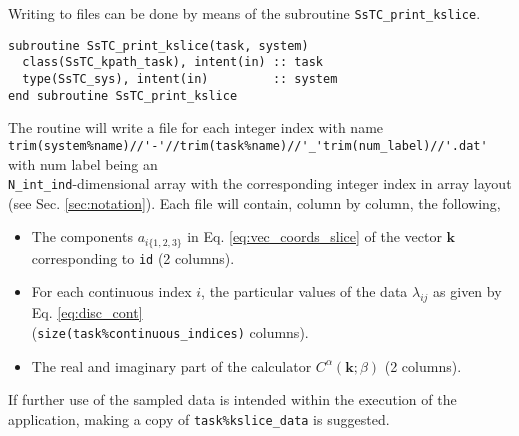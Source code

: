 \documentclass[10pt,a4paper]{article}
\begin{document}
Writing to files can be done by means of the subroutine \verb|SsTC_print_kslice|.
\begin{lstlisting}[caption={Interface of the ``kslice" printer.},captionpos=b]
subroutine SsTC_print_kslice(task, system)
  class(SsTC_kpath_task), intent(in) :: task
  type(SsTC_sys), intent(in)         :: system
end subroutine SsTC_print_kslice
\end{lstlisting}
The routine will write a file for each integer index with name \\ \verb|trim(system%name)//'-'//trim(task%name)//'_'trim(num_label)//'.dat'| with num label being an \\ \verb|N_int_ind|-dimensional array with the corresponding integer index in array layout (see Sec. \ref{sec:notation}). Each file will contain, column by column, the following,
\begin{itemize}
\item The components $a_{i\{1, 2, 3\}}$ in Eq. \eqref{eq:vec_coords_slice} of the vector $\bm{k}$ corresponding to \verb|id| (2 columns).
\item For each continuous index $i$, the particular values of the data $\lambda_{ij}$ as given by Eq. \eqref{eq:disc_cont} \\ (\verb|size(task%continuous_indices)| columns).
\item The real and imaginary part of the calculator $C^{\alpha}(\bm{k};\beta)$ (2 columns).
\end{itemize}
If further use of the sampled data is intended within the execution of the application, making a copy of \verb|task%kslice_data| is suggested.
\end{document}

